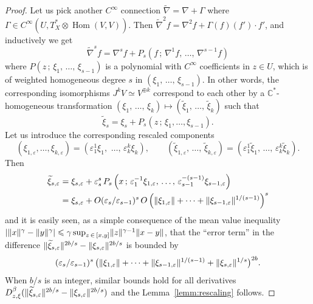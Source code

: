 \documentclass[10pt,a4paper]{article}
\DeclareMathOperator{\Hom}{Hom}
\DeclarePairedDelimiter{\abs}{\lvert}{\rvert}
\DeclarePairedDelimiter{\Abs}{\lVert}{\rVert}
\newcommand*\bC{\mathbb{C}}
\let\leq\leqslant
\numberwithin{equation}{section}
\begin{document}
\begin{proof}
Let us pick another $C^\infty$ connection $\widetilde\nabla= \nabla+\Gamma$ where $\Gamma\in C^\infty(U,T^*_X\otimes \Hom(V,V))$. Then
$\widetilde\nabla^2f=\nabla^2f+\Gamma(f)(f')\cdot f'$, and inductively we get
\[
\widetilde\nabla^sf=\nabla^sf+P_s\left(f\,;\,\nabla^1f,\,\dotsc,\,\nabla^{s-1}f\right)
\]
where $P(z\,;\,\xi_1,\,\dotsc,\,\xi_{s-1})$ is a polynomial with $C^\infty$ coefficients in $z\in U$, which is of weighted homogeneous degree $s$ in
$(\xi_1,\,\dotsc,\,\xi_{s-1})$. In other words, the corresponding isomorphisms
$J^kV\simeq V^{\oplus k}$ correspond to each other by a
$\bC^*$-homogeneous transformation
$(\xi_1,\,\dotsc,\,\xi_k)\mapsto (\widetilde\xi_1,\,\dotsc,\,\widetilde\xi_k)$ such that
\[
\widetilde\xi_s=\xi_s+P_s\left(z\,;\,\xi_1,\dotsc,\xi_{s-1}\right).
\]
Let us introduce the corresponding rescaled components
\[
(\xi_{1,\varepsilon},\dotsc,\xi_{k,\varepsilon})= \left(\varepsilon_1^1\xi_1,\,\,\dotsc,\,\varepsilon_k^k\xi_k\right),\qquad (\widetilde\xi_{1,\varepsilon},\,\dotsc,\,\widetilde\xi_{k,\varepsilon})= \left(\varepsilon_1^1\widetilde\xi_1,\,\dotsc,\,\varepsilon_k^k\widetilde\xi_k\right).
\]
Then
\begin{align*}
\widetilde\xi_{s,\varepsilon} &=
\xi_{s,\varepsilon}+
\varepsilon_s^s\,P_s\left(x\,;\,\varepsilon_1^{-1}\xi_{1,\varepsilon},\,\dotsc,\,
\varepsilon_{s-1}^{-(s-1)}\xi_{s-1,\varepsilon}\right)
\\
&=
\xi_{s,\varepsilon}+O(\varepsilon_s/\varepsilon_{s-1})^s\, O\left(\Abs{\xi_{1,\varepsilon}} +\dotsb+
\Abs{\xi_{s-1,\varepsilon}}^{1/(s-1)}\right)^s
\end{align*}
and it is easily seen, as a simple consequence of the mean value inequality
$\abs{\Abs{x}^\gamma-\Abs{y}^\gamma}\leq\gamma\sup_{z\,\in\,[x,y]}
\Abs{z}^{\gamma-1}\Abs{x-y}$, that the ``error term'' in the difference
$\Abs{\widetilde\xi_{s,\varepsilon}}^{2b/s}-\Abs{\xi_{s,\varepsilon}}^{2b/s}$ is bounded by
\[
(\varepsilon_s/\varepsilon_{s-1})^s\,
\big(\Abs{\xi_{1,\varepsilon}}+\cdots+
\Abs{\xi_{s-1,\varepsilon}}^{1/(s-1)}+
\Abs{\xi_{s,\varepsilon}}^{1/s}\big)^{2b}.
\]
When $b/s$ is an integer, similar bounds hold for all derivatives $D_{z,\xi}^\beta(\Abs{\widetilde\xi_{s,\varepsilon}}^{2b/s}-
\Abs{\xi_{s,\varepsilon}}^{2b/s})$ and the Lemma~\ref{lemm:rescaling} follows.
\end{proof}
\end{document}
